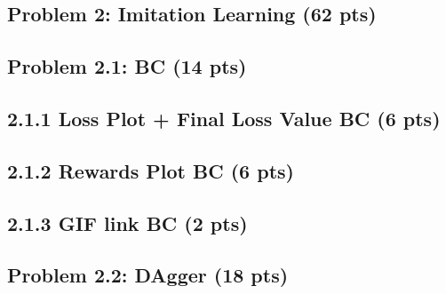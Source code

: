 \documentclass[12pt]{article}
\begin{document}
\newpage

\subsection*{Problem 2: Imitation Learning (62 pts)}
\subsection*{Problem 2.1: BC (14 pts)}

\subsection*{2.1.1 Loss Plot + Final Loss Value BC (6 pts)}
\begin{tcolorbox}[fit,height=20em, width=40em, blank, borderline={1pt}{1pt},nobeforeafter]
            \begin{solution}                  

                                    \end{solution}
            \end{tcolorbox}

\subsection*{2.1.2 Rewards Plot BC (6 pts)}

\begin{tcolorbox}[fit,height=24em, width=40em, blank, borderline={1pt}{1pt},nobeforeafter]
            \begin{solution}

                                \end{solution}

\end{tcolorbox}
\subsection*{2.1.3 GIF link BC (2 pts)}

\begin{tcolorbox}[fit,height=5em, width=40em, blank, borderline={1pt}{1pt},nobeforeafter]
            \begin{solution}
                                \end{solution}

\end{tcolorbox}

\subsection*{Problem 2.2: DAgger (18 pts)}
\end{document}
